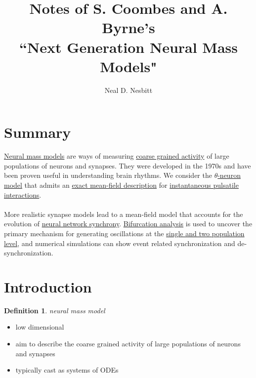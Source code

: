 \documentclass{article}
\title{Notes of S. Coombes and A. Byrne's\\
``Next Generation Neural Mass Models"}
\author{Neal D. Nesbitt}
\begin{document}
\maketitle

\theoremstyle{definition}
\newtheorem{definition}{Definition}[section]
\newtheorem{function}{Function}[section]

\section*{Summary}

\underline{Neural mass models} are ways of measuring \underline{coarse grained activity} of large populations of neurons and synapses. They were developed in the 1970s and have been proven useful in understanding brain rhythms. We consider the \underline{$\theta$-neuron model} that admits an \underline{exact mean-field description} for \underline{instantaneous pulsatile interactions}.

\paragraph{}
More realistic synapse models lead to a mean-field model that accounts for the evolution of \underline{neural network synchrony}. \underline{Bifurcation analysis} is used to uncover the primary mechanism for generating oscillations at the \underline{single and two population level}, and numerical simulations can show event related synchronization and de-synchronization.

\section{Introduction}

\begin{definition}{\it{neural mass model}}\label{def:neuralmassmodel}
\begin{itemize}[noitemsep]
\item low dimensional
\item aim to describe the coarse grained activity of large populations of neurons and synapses
\item typically cast as systems of ODEs
\end{itemize}
\end{definition}
\end{document}
